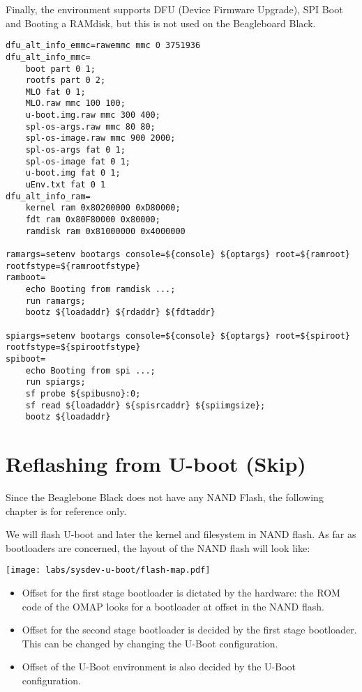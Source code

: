 \clearpage

Finally, the environment supports DFU (Device Firmware Upgrade), SPI Boot and Booting a RAMdisk,
but this is not used on the Beagleboard Black.

\begin{lstlisting}
dfu_alt_info_emmc=rawemmc mmc 0 3751936
dfu_alt_info_mmc=
	boot part 0 1;
	rootfs part 0 2;
	MLO fat 0 1;
	MLO.raw mmc 100 100;
	u-boot.img.raw mmc 300 400;
	spl-os-args.raw mmc 80 80;
	spl-os-image.raw mmc 900 2000;
	spl-os-args fat 0 1;
	spl-os-image fat 0 1;
	u-boot.img fat 0 1;
	uEnv.txt fat 0 1
dfu_alt_info_ram=
	kernel ram 0x80200000 0xD80000;
	fdt ram 0x80F80000 0x80000;
	ramdisk ram 0x81000000 0x4000000

ramargs=setenv bootargs console=${console} ${optargs} root=${ramroot} rootfstype=${ramrootfstype}
ramboot=
	echo Booting from ramdisk ...; 
	run ramargs; 
	bootz ${loadaddr} ${rdaddr} ${fdtaddr}

spiargs=setenv bootargs console=${console} ${optargs} root=${spiroot} rootfstype=${spirootfstype}
spiboot=
	echo Booting from spi ...;
	run spiargs; 
	sf probe ${spibusno}:0; 
	sf read ${loadaddr} ${spisrcaddr} ${spiimgsize}; 
	bootz ${loadaddr}
\end{lstlisting}


\clearpage


\section{Reflashing from U-boot (Skip)}

Since the Beaglebone Black does not have any NAND Flash, the following
chapter is for reference only.

We will flash U-boot and later the kernel and filesystem in NAND
flash. As far as bootloaders are concerned, the layout of the NAND
flash will look like:

\begin{center}
  \texttt{[image: labs/sysdev-u-boot/flash-map.pdf]}
\end{center}

\begin{itemize}
\item Offset  for the first stage bootloader is dictated by
  the hardware: the ROM code of the OMAP looks for a bootloader at
  offset  in the NAND flash.
\item Offset  for the second stage bootloader is decided
  by the first stage bootloader. This can be changed by changing the
  U-Boot configuration.
\item Offset  of the U-Boot environment is also decided
  by the U-Boot configuration.
\end{itemize}

